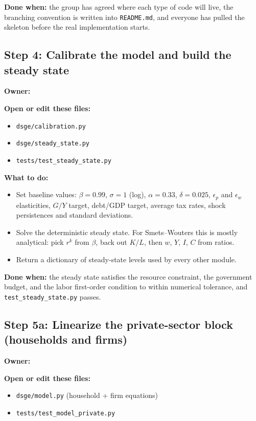 \documentclass[11pt]{article}
\newcommand{\nameblank}{\underline{\hspace{4.5cm}}}
\begin{document}
\textbf{Done when:} the group has agreed where each type of code will live, the branching convention is written into \texttt{README.md}, and everyone has pulled the skeleton before the real implementation starts.

\subsection{Step 4: Calibrate the model and build the steady state}
\textbf{Owner:} \nameblank

\textbf{Open or edit these files:}
\begin{itemize}
    \item \texttt{dsge/calibration.py}
    \item \texttt{dsge/steady\_state.py}
    \item \texttt{tests/test\_steady\_state.py}
\end{itemize}

\textbf{What to do:}
\begin{itemize}
    \item Set baseline values: $\beta=0.99$, $\sigma=1$ (log), $\alpha=0.33$, $\delta=0.025$, $\epsilon_p$ and $\epsilon_w$ elasticities, $G/Y$ target, debt/GDP target, average tax rates, shock persistences and standard deviations.
    \item Solve the deterministic steady state. For Smets--Wouters this is mostly analytical: pick $r^k$ from $\beta$, back out $K/L$, then $w$, $Y$, $I$, $C$ from ratios.
    \item Return a dictionary of steady-state levels used by every other module.
\end{itemize}

\textbf{Done when:} the steady state satisfies the resource constraint, the government budget, and the labor first-order condition to within numerical tolerance, and \texttt{test\_steady\_state.py} passes.

\subsection{Step 5a: Linearize the private-sector block (households and firms)}
\textbf{Owner:} \nameblank

\textbf{Open or edit these files:}
\begin{itemize}
    \item \texttt{dsge/model.py} (household + firm equations)
    \item \texttt{tests/test\_model\_private.py}
\end{itemize}
\end{document}
